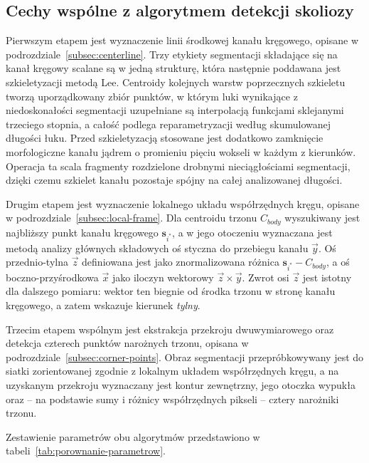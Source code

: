 \subsection{Cechy wspólne z algorytmem detekcji skoliozy}
\label{subsec:wspolne-etapy}

Pierwszym etapem jest wyznaczenie linii środkowej kanału kręgowego, opisane w podrozdziale~\ref{subsec:centerline}.
Trzy etykiety segmentacji składające się na kanał kręgowy scalane są w jedną strukturę, która następnie poddawana jest szkieletyzacji metodą Lee.
Centroidy kolejnych warstw poprzecznych szkieletu tworzą uporządkowany zbiór punktów, w którym luki wynikające z niedoskonałości segmentacji uzupełniane są interpolacją funkcjami sklejanymi trzeciego stopnia, a całość podlega reparametryzacji według skumulowanej długości łuku.
Przed szkieletyzacją stosowane jest dodatkowo zamknięcie morfologiczne kanału jądrem o promieniu pięciu wokseli w każdym z kierunków.
Operacja ta scala fragmenty rozdzielone drobnymi nieciągłościami segmentacji, dzięki czemu szkielet kanału pozostaje spójny na całej analizowanej długości.

Drugim etapem jest wyznaczenie lokalnego układu współrzędnych kręgu, opisane w podrozdziale~\ref{subsec:local-frame}.
Dla centroidu trzonu $C_{body}$ wyszukiwany jest najbliższy punkt kanału kręgowego $\mathbf{s}_{i^*}$, a w jego otoczeniu wyznaczana jest metodą analizy głównych składowych oś styczna do przebiegu kanału $\vec{y}$.
Oś przednio-tylna $\vec{z}$ definiowana jest jako znormalizowana różnica $\mathbf{s}_{i^*} - C_{body}$, a oś boczno-przyśrodkowa $\vec{x}$ jako iloczyn wektorowy $\vec{z} \times \vec{y}$.
Zwrot osi $\vec{z}$ jest istotny dla dalszego pomiaru: wektor ten biegnie od środka trzonu w stronę kanału kręgowego, a zatem wskazuje kierunek \textit{tylny}.

Trzecim etapem wspólnym jest ekstrakcja przekroju dwuwymiarowego oraz detekcja czterech punktów narożnych trzonu, opisana w podrozdziale~\ref{subsec:corner-points}.
Obraz segmentacji przepróbkowywany jest do siatki zorientowanej zgodnie z lokalnym układem współrzędnych kręgu, a na uzyskanym przekroju wyznaczany jest kontur zewnętrzny, jego otoczka wypukła oraz -- na podstawie sumy i różnicy współrzędnych pikseli -- cztery narożniki trzonu.

Zestawienie parametrów obu algorytmów przedstawiono w tabeli~\ref{tab:porownanie-parametrow}.

